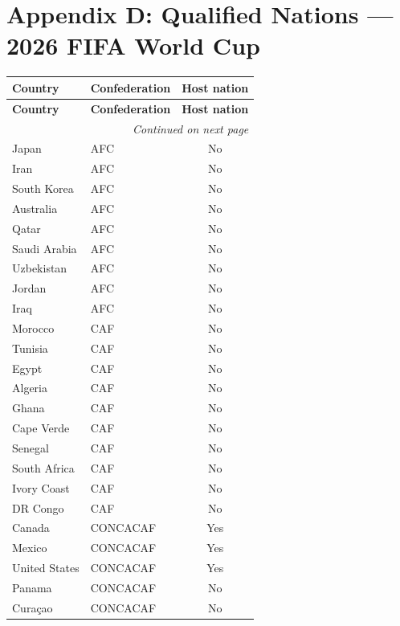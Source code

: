 \documentclass[12pt]{article}
\begin{document}
\section*{Appendix D: Qualified Nations --- 2026 FIFA World Cup}

\begin{longtable}{llc}
\toprule
\textbf{Country} & \textbf{Confederation} & \textbf{Host nation} \\
\midrule
\endfirsthead
\toprule
\textbf{Country} & \textbf{Confederation} & \textbf{Host nation} \\
\midrule
\endhead
\midrule
\multicolumn{3}{r}{\textit{Continued on next page}} \\
\endfoot
\bottomrule
\endlastfoot
Japan          & AFC & No \\
Iran           & AFC & No \\
South Korea    & AFC & No \\
Australia      & AFC & No \\
Qatar          & AFC & No \\
Saudi Arabia   & AFC & No \\
Uzbekistan     & AFC & No \\
Jordan         & AFC & No \\
Iraq           & AFC & No \\
Morocco        & CAF & No \\
Tunisia        & CAF & No \\
Egypt          & CAF & No \\
Algeria        & CAF & No \\
Ghana          & CAF & No \\
Cape Verde     & CAF & No \\
Senegal        & CAF & No \\
South Africa   & CAF & No \\
Ivory Coast    & CAF & No \\
DR Congo       & CAF & No \\
Canada         & CONCACAF & Yes \\
Mexico         & CONCACAF & Yes \\
United States  & CONCACAF & Yes \\
Panama         & CONCACAF & No \\
Cura\c{c}ao   & CONCACAF & No \\

\end{longtable}
\end{document}
